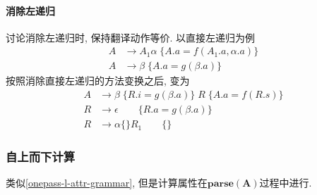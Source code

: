 \documentclass{ctexart}
\begin{document}
\paragraph{消除左递归} 讨论消除左递归时, 保持翻译动作等价. 以直接左递归为例\begin{align*}
        A & \to A_1 \alpha \; \{A.a = f(A_1.a, \alpha.a)\}\\
        A & \to \beta  \; \{A.a = g(\beta.a)\}
    \end{align*}
    按照消除直接左递归的方法变换之后, 变为 \begin{align*}
        A & \to \beta \; \{ R.i = g(\beta.a) \} \; R \; \{A.a = f(R.s)\}\\
        R & \to \epsilon  \qquad \{R.a = g(\beta.a)\}\\
        R & \to \alpha \{\} R_1  \qquad \{\}
    \end{align*}
\subsubsection{自上而下计算} 类似\ref{onepass-l-attr-grammar}, 但是计算属性在$\mathbf{parse(A)}$过程中进行.
\end{document}
